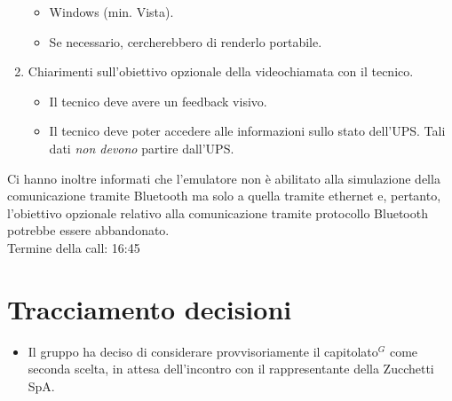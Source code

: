 \begin{enumerate}
    \begin{itemize}
        \item Windows (min. Vista).
        \item Se necessario, cercherebbero di renderlo portabile.
    \end{itemize}
    \item Chiarimenti sull'obiettivo opzionale della videochiamata con il tecnico.
    \begin{itemize}
        \item Il tecnico deve avere un feedback visivo.
        \item Il tecnico deve poter accedere alle informazioni sullo stato dell'UPS. Tali dati \emph{non devono} partire dall'UPS.
    \end{itemize}
\end{enumerate}
Ci hanno inoltre informati che l'emulatore non è abilitato alla simulazione della comunicazione tramite Bluetooth ma solo a quella tramite ethernet e, pertanto, l'obiettivo opzionale relativo alla comunicazione tramite protocollo Bluetooth potrebbe essere abbandonato.\\
Termine della call: 16:45

\section{Tracciamento decisioni}
\begin{itemize}
    \item Il gruppo ha deciso di considerare provvisoriamente il capitolato$^{G}$ come seconda scelta, in attesa dell'incontro con il rappresentante della Zucchetti SpA.
\end{itemize}
